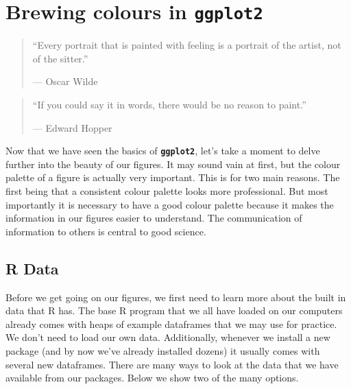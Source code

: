 \documentclass[]{book}
\theoremstyle{definition}
\theoremstyle{definition}
\theoremstyle{definition}
\theoremstyle{remark}
\begin{document}
\chapter{\texorpdfstring{Brewing colours in
\textbf{\texttt{ggplot2}}}{Brewing colours in ggplot2}}\label{brewing}

\begin{quote}
``Every portrait that is painted with feeling is a portrait of the
artist, not of the sitter.''

--- Oscar Wilde
\end{quote}

\begin{quote}
``If you could say it in words, there would be no reason to paint.''

--- Edward Hopper
\end{quote}

Now that we have seen the basics of \textbf{\texttt{ggplot2}}, let's
take a moment to delve further into the beauty of our figures. It may
sound vain at first, but the colour palette of a figure is actually very
important. This is for two main reasons. The first being that a
consistent colour palette looks more professional. But most importantly
it is necessary to have a good colour palette because it makes the
information in our figures easier to understand. The communication of
information to others is central to good science.

\section{R Data}\label{r-data}

Before we get going on our figures, we first need to learn more about
the built in data that R has. The base R program that we all have loaded
on our computers already comes with heaps of example dataframes that we
may use for practice. We don't need to load our own data. Additionally,
whenever we install a new package (and by now we've already installed
dozens) it usually comes with several new dataframes. There are many
ways to look at the data that we have available from our packages. Below
we show two of the many options.
\end{document}

